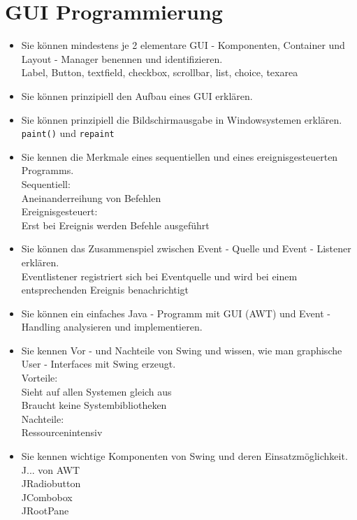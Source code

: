 \section{GUI Programmierung}
\begin{itemize}
  \item Sie können mindestens je 2 elementare GUI - Komponenten, Container und Layout - Manager benennen und identifizieren. \\
        Label, Button, textfield, checkbox, scrollbar, list, choice, texarea 
  \item Sie können prinzipiell den Aufbau eines GUI erklären. \\
        
  \item Sie können prinzipiell die Bildschirmausgabe in Windowsystemen erklären. \\
        \verb!paint()! und \verb!repaint!
  \item Sie kennen die Merkmale eines sequentiellen und eines ereignisgesteuerten Programms. \\
        Sequentiell: \\
        Aneinanderreihung von Befehlen\\
        Ereignisgesteuert: \\
        Erst bei Ereignis werden Befehle ausgeführt
  \item Sie können das Zusammenspiel zwischen Event - Quelle und Event - Listener erklären. \\
        Eventlistener registriert sich bei Eventquelle und wird bei einem entsprechenden Ereignis benachrichtigt
  \item Sie können ein einfaches Java - Programm mit GUI (AWT) und Event - Handling analysieren und implementieren. \\
        
  \item Sie kennen Vor - und Nachteile von Swing und wissen, wie man graphische User - Interfaces mit Swing erzeugt. \\
        Vorteile: \\
        Sieht auf allen Systemen gleich aus \\
        Braucht keine Systembibliotheken \\
        Nachteile: \\
        Ressourcenintensiv
  \item Sie kennen wichtige Komponenten von Swing und deren Einsatzmöglichkeit. \\
        J... von AWT\\
        JRadiobutton \\
        JCombobox \\
        JRootPane
\end{itemize}

